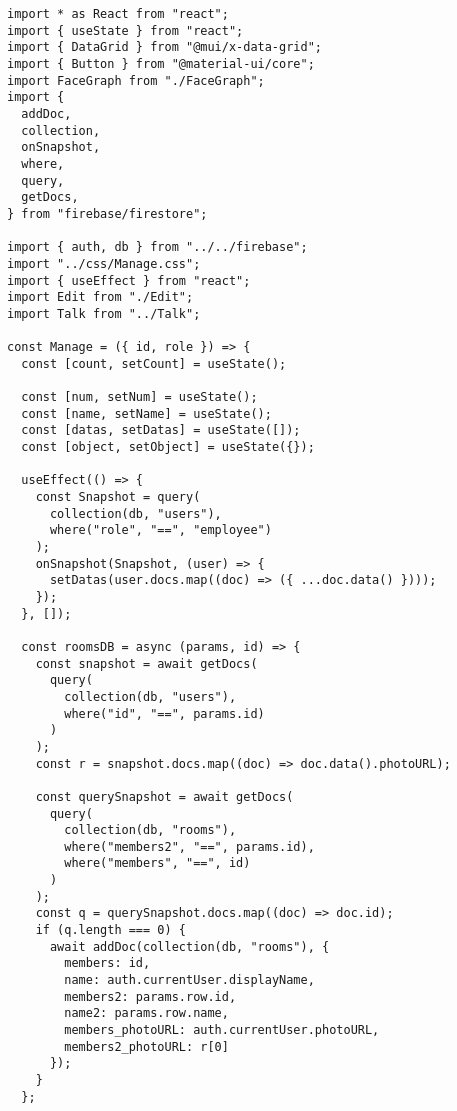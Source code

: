 \begin{verbatim}
import * as React from "react";
import { useState } from "react";
import { DataGrid } from "@mui/x-data-grid";
import { Button } from "@material-ui/core";
import FaceGraph from "./FaceGraph";
import {
  addDoc,
  collection,
  onSnapshot,
  where,
  query,
  getDocs,
} from "firebase/firestore";

import { auth, db } from "../../firebase";
import "../css/Manage.css";
import { useEffect } from "react";
import Edit from "./Edit";
import Talk from "../Talk";

const Manage = ({ id, role }) => {
  const [count, setCount] = useState();

  const [num, setNum] = useState();
  const [name, setName] = useState();
  const [datas, setDatas] = useState([]);
  const [object, setObject] = useState({});

  useEffect(() => {
    const Snapshot = query(
      collection(db, "users"),
      where("role", "==", "employee")
    );
    onSnapshot(Snapshot, (user) => {
      setDatas(user.docs.map((doc) => ({ ...doc.data() })));
    });
  }, []);

  const roomsDB = async (params, id) => {
    const snapshot = await getDocs(
      query(
        collection(db, "users"),
        where("id", "==", params.id)
      )
    );
    const r = snapshot.docs.map((doc) => doc.data().photoURL);

    const querySnapshot = await getDocs(
      query(
        collection(db, "rooms"),
        where("members2", "==", params.id),
        where("members", "==", id)
      )
    );
    const q = querySnapshot.docs.map((doc) => doc.id);
    if (q.length === 0) {
      await addDoc(collection(db, "rooms"), {
        members: id,
        name: auth.currentUser.displayName,
        members2: params.row.id,
        name2: params.row.name,
        members_photoURL: auth.currentUser.photoURL,
        members2_photoURL: r[0]
      });
    }
  };


\end{verbatim}
